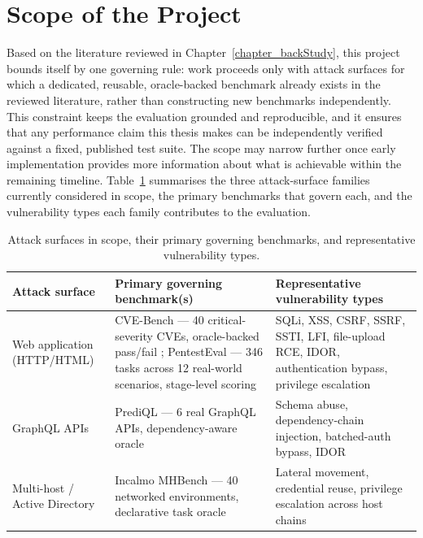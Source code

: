 \section{Scope of the Project}
\label{sec:intro_scope}

Based on the literature reviewed in Chapter~\ref{chapter_backStudy}, this project bounds itself by one governing rule: work proceeds only with attack surfaces for which a dedicated, reusable, oracle-backed benchmark already exists in the reviewed literature, rather than constructing new benchmarks independently. This constraint keeps the evaluation grounded and reproducible, and it ensures that any performance claim this thesis makes can be independently verified against a fixed, published test suite. The scope may narrow further once early implementation provides more information about what is achievable within the remaining timeline. Table~\ref{tab:in-scope-surfaces} summarises the three attack-surface families currently considered in scope, the primary benchmarks that govern each, and the vulnerability types each family contributes to the evaluation.

\begin{table}[htbp]
	\centering
	\small
	\caption{Attack surfaces in scope, their primary governing benchmarks, and representative vulnerability types.}
	\label{tab:in-scope-surfaces}
	\begin{tabular}{@{}p{2.8cm}p{5.2cm}p{5.3cm}@{}}
		\toprule
		\textbf{Attack surface}       & \textbf{Primary governing benchmark(s)}                                                                                                                                                             & \textbf{Representative vulnerability types}                                                          \\
		\midrule
		Web application (HTTP/HTML)   & CVE-Bench --- 40 critical-severity CVEs, oracle-backed pass/fail \citep{zhu2025cvebench}; PentestEval --- 346 tasks across 12 real-world scenarios, stage-level scoring \citep{yang2025pentesteval} & SQLi, XSS, CSRF, SSRF, SSTI, LFI, file-upload RCE, IDOR, authentication bypass, privilege escalation \\
		GraphQL APIs                  & PrediQL --- 6 real GraphQL APIs, dependency-aware oracle \citep{liu2025prediql}                                                                                                                     & Schema abuse, dependency-chain injection, batched-auth bypass, IDOR                                  \\
		Multi-host / Active Directory & Incalmo MHBench --- 40 networked environments, declarative task oracle \citep{singer2025incalmo}                                                                                                    & Lateral movement, credential reuse, privilege escalation across host chains                          \\
		\bottomrule
	\end{tabular}
\end{table}

